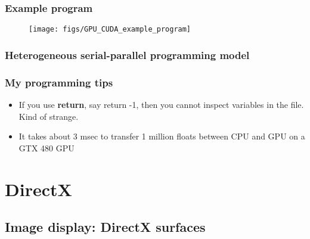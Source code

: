 \begin{frame}\frametitle{Example program}\logoEvolution\mypagenum
	\begin{figure}
		\texttt{[image: figs/GPU\_CUDA\_example\_program]}
	\end{figure}
\end{frame}


\begin{frame}\frametitle{Heterogeneous serial-parallel programming model}\logoEvolution\mypagenum
\end{frame}



\begin{frame}\frametitle{My programming tips}\logoEvolution\mypagenum
	\begin{itemize}
		\item If you use \textbf{return}, say return -1, then you cannot inspect variables in the file.  Kind of strange.
		\item It takes about 3 msec to transfer 1 million floats between CPU and GPU on a GTX 480 GPU
	\end{itemize}
\end{frame}



\section{DirectX}
\subsection{Image display: DirectX surfaces}
	
